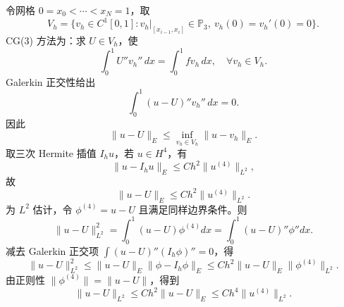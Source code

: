 ﻿\documentclass[UTF8,12pt]{ctexart}
\begin{document}
\begin{enumerate}[label=\textbf{\arabic*.},leftmargin=2.2em]
令网格 \(0=x_0<\cdots<x_N=1\)，取
\[
V_h=\{v_h\in C^1[0,1]: v_h|_{[x_{i-1},x_i]}\in\mathbb P_3,\ v_h(0)=v_h'(0)=0\}.
\]
CG(3) 方法为：求 \(U\in V_h\)，使
\[
\int_0^1 U''v_h''\,dx=\int_0^1fv_h\,dx,\quad\forall v_h\in V_h.
\]
Galerkin 正交性给出
\[
\int_0^1 (u-U)''v_h''\,dx=0.
\]
因此
\[
\|u-U\|_E\le \inf_{v_h\in V_h}\|u-v_h\|_E.
\]
取三次 Hermite 插值 \(I_hu\)，若 \(u\in H^4\)，有
\[
\|u-I_hu\|_E\le Ch^2\|u^{(4)}\|_{L^2},
\]
故
\[
\|u-U\|_E\le Ch^2\|u^{(4)}\|_{L^2}.
\]
为 \(L^2\) 估计，令 \(\phi^{(4)}=u-U\) 且满足同样边界条件。则
\[
\|u-U\|_{L^2}^2=\int_0^1 (u-U)\phi^{(4)}dx
=\int_0^1 (u-U)''\phi''dx.
\]
减去 Galerkin 正交项 \(\int (u-U)''(I_h\phi)''=0\)，得
\[
\|u-U\|_{L^2}^2
\le \|u-U\|_E\|\phi-I_h\phi\|_E
\le Ch^2\|u-U\|_E\|\phi^{(4)}\|_{L^2}.
\]
由正则性 \(\|\phi^{(4)}\|=\|u-U\|\)，得到
\[
\|u-U\|_{L^2}\le Ch^2\|u-U\|_E\le Ch^4\|u^{(4)}\|_{L^2}.
\]
\end{enumerate}
\end{document}
